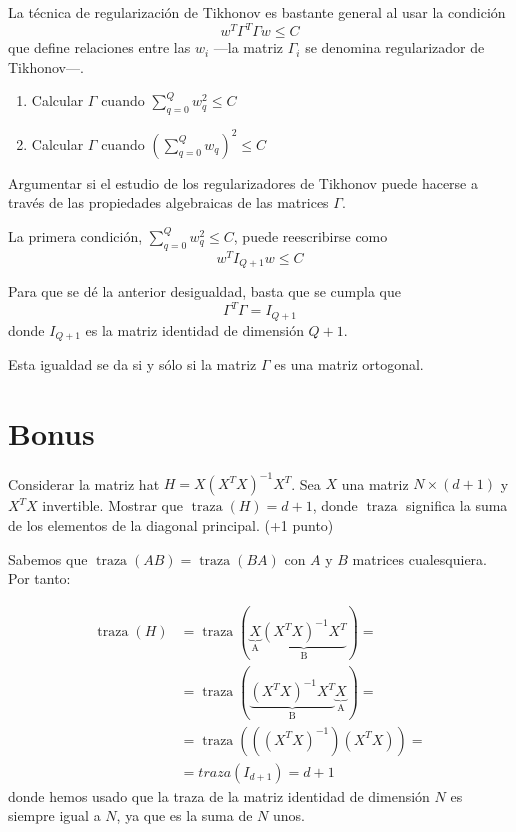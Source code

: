 \documentclass[a4paper, 11pt]{article}
\begin{document}
      \begin{ejercicio}
        La técnica de regularización de Tikhonov es bastante general al usar la condición
        \[
        w^T\Gamma^T\Gamma w \leq C
        \]
        que define relaciones entre las $w_i$ ---la matriz $\Gamma_i$ se denomina regularizador de Tikhonov---.
        \begin{enumerate}
        \item Calcular $\Gamma$ cuando $\sum_{q=0}^Q w_q^2 \leq C$
        \item Calcular $\Gamma$ cuando $(\sum_{q=0}^Q w_q)^2 \leq C$
        \end{enumerate}
        Argumentar si el estudio de los regularizadores de Tikhonov puede hacerse a través de las propiedades algebraicas de las matrices $\Gamma$.
      \end{ejercicio}

      \begin{solucion}
          La primera condición, $\sum_{q=0}^Q w_q^2 \leq C$, puede reescribirse como
          \[
          w^T I_{Q+1} w \leq C
          \]

          Para que se dé la anterior desigualdad, basta que se cumpla que
          \[
          \Gamma^T\Gamma = I_{Q+1}
          \]
          donde $I_{Q+1}$ es la matriz identidad de dimensión $Q+1$.

          Esta igualdad se da si y sólo si la matriz $\Gamma$ es una matriz ortogonal.

      \end{solucion}


    \section{Bonus}

    \begin{bonus}
      Considerar la matriz hat $H = X(X^TX)^{-1}X^T$. Sea $X$ una matriz  $N \times (d+1)$ y $X^TX$ invertible. Mostrar que $\operatorname{traza}(H)=d+1$, donde $\operatorname{traza}$ significa la suma de los elementos de la diagonal principal. (+1 punto)
    \end{bonus}

    \begin{solucion}
        Sabemos que $\operatorname{traza}(AB) = \operatorname{traza}(BA)$ con $A$ y $B$ matrices cualesquiera. Por tanto:

        \begin{align*}
            \operatorname{traza}(H) &= \operatorname{traza}(\underbrace{X}_\textrm{A}\underbrace{(X^TX)^{-1}X^T}_\textrm{B}) = \\
            &= \operatorname{traza}(\underbrace{(X^TX)^{-1}X^T}_\textrm{B}\underbrace{X}_\textrm{A}) = \\
            &= \operatorname{traza}\left(\left((X^TX)^{-1}\right)\left(X^TX\right)\right) = \\ &= traza(I_{d+1}) = d+1
        \end{align*}
        donde hemos usado que la traza de la matriz identidad de dimensión $N$ es siempre igual a $N$, ya que es la suma de $N$ unos.
    \end{solucion}
\end{document}

